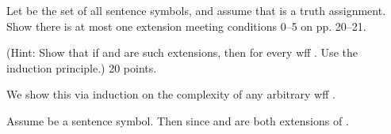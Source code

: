 			\item  Let  be the set of all sentence symbols, and assume that  is a truth assignment. Show there is at most one extension  meeting conditions 0–5 on pp. 20–21.

				(Hint: Show that if  and  are such extensions, then  for every wff . Use the induction principle.)  20 points.

				\startsolution
					We show this via induction on the complexity of any arbitrary wff .
					\startitemize [1]
						
						\item  {}  \qquad
							Assume  be a sentence symbol. Then  since  and  are both extensions of .

